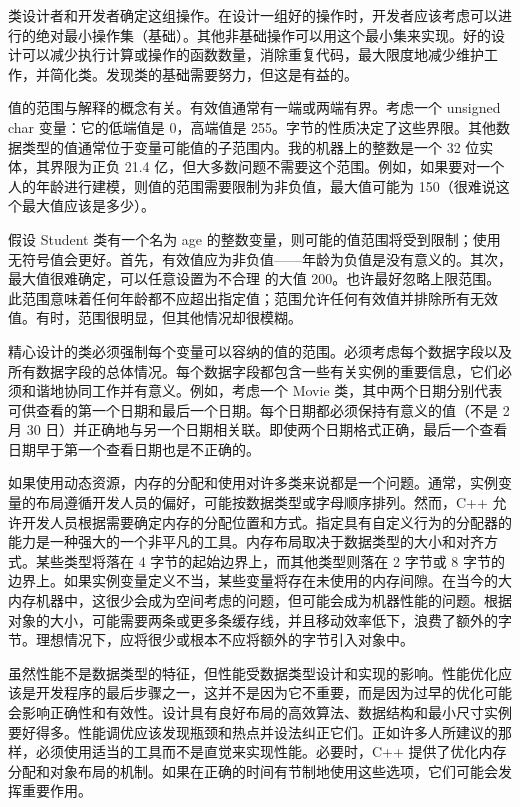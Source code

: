 类设计者和开发者确定这组操作。在设计一组好的操作时，开发者应该考虑可以进行的绝对最小操作集（基础）。其他非基础操作可以用这个最小集来实现。好的设计可以减少执行计算或操作的函数数量，消除重复代码，最大限度地减少维护工作，并简化类。发现类的基础需要努力，但这是有益的。


值的范围与解释的概念有关。有效值通常有一端或两端有界。考虑一个 unsigned char 变量：它的低端值是 0，高端值是 255。字节的性质决定了这些界限。其他数据类型的值通常位于变量可能值的子范围内。我的机器上的整数是一个 32 位实体，其界限为正负 21.4 亿，但大多数问题不需要这个范围。例如，如果要对一个人的年龄进行建模，则值的范围需要限制为非负值，最大值可能为 150（很难说这个最大值应该是多少）。

假设 Student 类有一个名为 age 的整数变量，则可能的值范围将受到限制；使用无符号值会更好。首先，有效值应为非负值——年龄为负值是没有意义的。其次，最大值很难确定，可以任意设置为不合理 的大值 200。也许最好忽略上限范围。此范围意味着任何年龄都不应超出指定值；范围允许任何有效值并排除所有无效值。有时，范围很明显，但其他情况却很模糊。

精心设计的类必须强制每个变量可以容纳的值的范围。必须考虑每个数据字段以及所有数据字段的总体情况。每个数据字段都包含一些有关实例的重要信息，它们必须和谐地协同工作并有意义。例如，考虑一个 Movie 类，其中两个日期分别代表可供查看的第一个日期和最后一个日期。每个日期都必须保持有意义的值（不是 2 月 30 日）并正确地与另一个日期相关联。即使两个日期格式正确，最后一个查看日期早于第一个查看日期也是不正确的。


如果使用动态资源，内存的分配和使用对许多类来说都是一个问题。通常，实例变量的布局遵循开发人员的偏好，可能按数据类型或字母顺序排列。然而，C++ 允许开发人员根据需要确定内存的分配位置和方式。指定具有自定义行为的分配器的能力是一种强大的一个非平凡的工具。内存布局取决于数据类型的大小和对齐方式。某些类型将落在 4 字节的起始边界上，而其他类型则落在 2 字节或 8 字节的边界上。如果实例变量定义不当，某些变量将存在未使用的内存间隙。在当今的大内存机器中，这很少会成为空间考虑的问题，但可能会成为机器性能的问题。根据对象的大小，可能需要两条或更多条缓存线，并且移动效率低下，浪费了额外的字节。理想情况下，应将很少或根本不应将额外的字节引入对象中。


虽然性能不是数据类型的特征，但性能受数据类型设计和实现的影响。性能优化应该是开发程序的最后步骤之一，这并不是因为它不重要，而是因为过早的优化可能会影响正确性和有效性。设计具有良好布局的高效算法、数据结构和最小尺寸实例要好得多。性能调优应该发现瓶颈和热点并设法纠正它们。正如许多人所建议的那样，必须使用适当的工具而不是直觉来实现性能。必要时，C++ 提供了优化内存分配和对象布局的机制。如果在正确的时间有节制地使用这些选项，它们可能会发挥重要作用。
